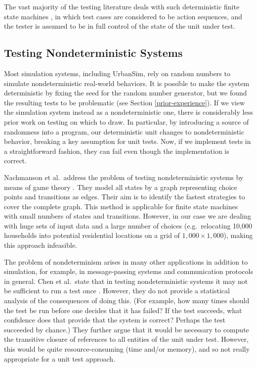 \documentclass{sig-alternate-preprint}
\begin{document}
The vast majority of the testing literature deals with such deterministic
finite state machines \cite{lee:1996,sidhu:1989,yannakakis:1991}, in which
test cases are considered to be action sequences, and the tester is assumed
to be in full control of the state of the unit under test.

\subsection{Testing Nondeterministic Systems}

Most simulation systems, including UrbanSim, rely on random numbers
to simulate nondeterministic real-world behaviors.  It is
possible to make the system deterministic by fixing the seed for the random
number generator, but we found the resulting tests to be problematic
(see Section \ref{prior-experience}).  If we view the simulation system instead
as a nondeterministic one, there is considerably less prior work on testing on
which to draw.  In particular, by introducing a source of randomness into a
program, our deterministic unit changes to nondeterministic behavior,
breaking a key assumption for unit tests.  Now, if we implement tests in a
straightforward fashion, they can fail even though the implementation is
correct.

Nachmanson et al.\ address the problem of testing nondeterministic systems by 
means of game theory \cite{nachmanson:2004}. They model all states by a graph 
representing choice points and transitions as edges. Their aim is to identify 
the fastest strategies to cover the complete graph. This method is applicable 
for finite state machines with small numbers of states and transitions.
However, in our case we are dealing with huge sets of input data and a large
number of choices (e.g.\ relocating 10,000 households into potential
residential locations on a grid of $1,000\times 1,000$), making this
approach infeasible.

The problem of nondeterminism arises in many other applications in addition
to simulation, for example, in message-passing systems
\cite{kranzmuller:1998} and communication protocols in general.  Chen et
al.\ state that in testing nondeterministic systems it may not be
sufficient to run a test once \cite[p.~217]{chen:1994}. However, they do
not provide a statistical analysis of the consequences of doing this.  (For
example, how many times should the test be run before one decides that it
has failed?  If the test succeeds, what confidence does that provide that
the system is correct?  Perhaps the test succeeded by chance.) They further
argue that it would be necessary to compute the transitive closure of
references to all entities of the unit under test.  However, this would be
quite resource-consuming (time and/or memory), and so not really
appropriate for a unit test approach.
\end{document}
